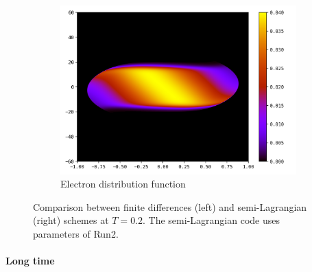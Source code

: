 \documentclass{article}
\numberwithin{equation}{section}
\newcommand{\imh}{\textheight} %
\newcommand{\imw}{\textwidth} %
\begin{document}
\begin{figure}
\begin{subfigure}{\textwidth}
		\includegraphics[height=\imh,width=\imw]{images/feT0p2.png}
		\caption{Electron distribution function}
		\label{subfig:compT02_electron}
	\end{subfigure}
	\caption{Comparison between finite differences (left) and semi-Lagrangian (right) schemes at $T=0.2$. The semi-Lagrangian code uses parameters of Run2.}
	\label{fig:compT02}
\end{figure}  


\paragraph{Long time}
\end{document}
